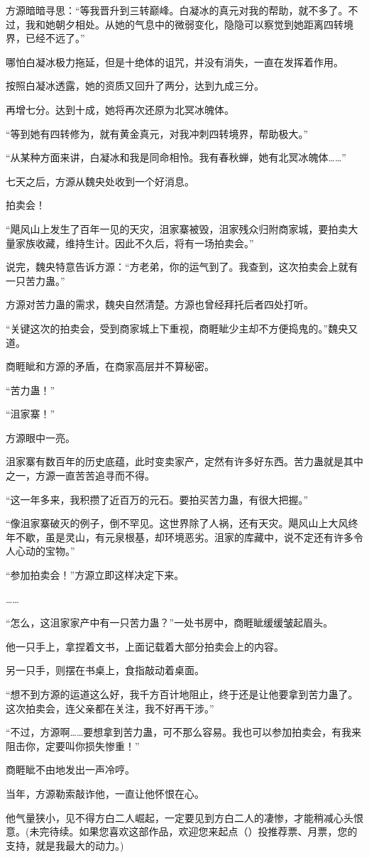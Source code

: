 \begin{this_body}
方源暗暗寻思：“等我晋升到三转巅峰。白凝冰的真元对我的帮助，就不多了。不过，我和她朝夕相处。从她的气息中的微弱变化，隐隐可以察觉到她距离四转境界，已经不远了。”

哪怕白凝冰极力拖延，但是十绝体的诅咒，并没有消失，一直在发挥着作用。

按照白凝冰透露，她的资质又回升了两分，达到九成三分。

再增七分。达到十成，她将再次还原为北冥冰魄体。

“等到她有四转修为，就有黄金真元，对我冲刺四转境界，帮助极大。”

“从某种方面来讲，白凝冰和我是同命相怜。我有春秋蝉，她有北冥冰魄体……”

七天之后，方源从魏央处收到一个好消息。

拍卖会！

“飓风山上发生了百年一见的天灾，沮家寨被毁，沮家残众归附商家城，要拍卖大量家族收藏，维持生计。因此不久后，将有一场拍卖会。”

说完，魏央特意告诉方源：“方老弟，你的运气到了。我查到，这次拍卖会上就有一只苦力蛊。”

方源对苦力蛊的需求，魏央自然清楚。方源也曾经拜托后者四处打听。

“关键这次的拍卖会，受到商家城上下重视，商睚眦少主却不方便捣鬼的。”魏央又道。

商睚眦和方源的矛盾，在商家高层并不算秘密。

“苦力蛊！”

“沮家寨！”

方源眼中一亮。

沮家寨有数百年的历史底蕴，此时变卖家产，定然有许多好东西。苦力蛊就是其中之一，方源一直苦苦追寻而不得。

“这一年多来，我积攒了近百万的元石。要拍买苦力蛊，有很大把握。”

“像沮家寨破灭的例子，倒不罕见。这世界除了人祸，还有天灾。飓风山上大风终年不歇，虽是灵山，有元泉根基，却环境恶劣。沮家的库藏中，说不定还有许多令人心动的宝物。”

“参加拍卖会！”方源立即这样决定下来。

……

“怎么，这沮家家产中有一只苦力蛊？”一处书房中，商睚眦缓缓皱起眉头。

他一只手上，拿捏着文书，上面记载着大部分拍卖会上的内容。

另一只手，则摆在书桌上，食指敲动着桌面。

“想不到方源的运道这么好，我千方百计地阻止，终于还是让他要拿到苦力蛊了。这次拍卖会，连父亲都在关注，我不好再干涉。”

“不过，方源啊……要想拿到苦力蛊，可不那么容易。我也可以参加拍卖会，有我来阻击你，定要叫你损失惨重！”

商睚眦不由地发出一声冷哼。

当年，方源勒索敲诈他，一直让他怀恨在心。

他气量狭小，见不得方白二人崛起，一定要见到方白二人的凄惨，才能稍减心头恨意。(未完待续。如果您喜欢这部作品，欢迎您来起点（）投推荐票、月票，您的支持，就是我最大的动力。)

\end{this_body}

